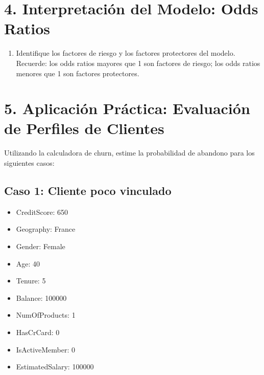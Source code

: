 \documentclass[
]{article}
\providecommand{\tightlist}{%
  \setlength{\itemsep}{0pt}\setlength{\parskip}{0pt}}
\begin{document}
\section{4. Interpretación del Modelo: Odds
Ratios}\label{interpretaciuxf3n-del-modelo-odds-ratios}

\begin{enumerate}
\def\labelenumi{\arabic{enumi}.}
\setcounter{enumi}{9}
\tightlist
\item
  Identifique los factores de riesgo y los factores protectores del
  modelo. Recuerde: los odds ratios mayores que 1 son factores de
  riesgo; los odds ratios menores que 1 son factores protectores.
\end{enumerate}

\section{5. Aplicación Práctica: Evaluación de Perfiles de
Clientes}\label{aplicaciuxf3n-pruxe1ctica-evaluaciuxf3n-de-perfiles-de-clientes}

Utilizando la calculadora de churn, estime la probabilidad de abandono
para los siguientes casos:

\subsection{Caso 1: Cliente poco
vinculado}\label{caso-1-cliente-poco-vinculado}

\begin{itemize}
\tightlist
\item
  CreditScore: 650\\
\item
  Geography: France\\
\item
  Gender: Female\\
\item
  Age: 40\\
\item
  Tenure: 5\\
\item
  Balance: 100000\\
\item
  NumOfProducts: 1\\
\item
  HasCrCard: 0\\
\item
  IsActiveMember: 0\\
\item
  EstimatedSalary: 100000
\end{itemize}
\end{document}
